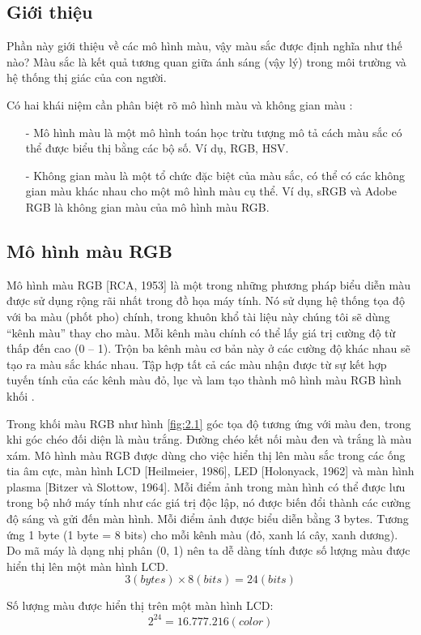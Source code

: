 \subsection{Giới thiệu}
Phần này giới thiệu về các mô hình màu, vậy màu sắc được định nghĩa như thế nào? Màu sắc là kết quả tương quan giữa ánh sáng (vậy lý) trong môi trường và hệ thống thị giác của con người.\par

Có hai khái niệm cần phân biệt rõ mô hình màu và không gian màu \cite{digitalimageprocessing}:
\begin{itemize}
    \item[-] Mô hình màu là một mô hình toán học trừu tượng mô tả cách màu sắc có thể được biểu thị bằng các bộ số. Ví dụ, RGB, HSV.
    \item[-] Không gian màu là một tổ chức đặc biệt của màu sắc, có thể có các không gian màu khác nhau cho một mô hình màu cụ thể. Ví dụ, sRGB và Adobe RGB là không gian màu của mô hình màu RGB.
\end{itemize}

\subsection{Mô hình màu RGB} \label{subsection-rgb-color-model}
Mô hình màu RGB [RCA, 1953] là một trong những phương pháp biểu diễn màu được sử dụng rộng rãi nhất trong đồ họa máy tính. Nó sử dụng hệ thống tọa độ với ba màu (phốt pho) chính, trong khuôn khổ tài liệu này chúng tôi sẽ dùng ``kênh màu'' thay cho màu. Mỗi kênh màu chính có thể lấy giá trị cường độ từ thấp đến cao (0 -- 1). Trộn ba kênh màu cơ bản này ở các cường độ khác nhau sẽ tạo ra màu sắc khác nhau. Tập hợp tất cả các màu nhận được từ sự kết hợp tuyến tính của các kênh màu đỏ, lục và lam tạo thành mô hình màu RGB hình khối .\par

Trong khối màu RGB như hình \ref{fig:2.1} góc tọa độ tương ứng với màu đen, trong khi góc chéo đối diện là màu trắng. Đường chéo kết nối màu đen và trắng là màu xám. Mô hình màu RGB được dùng cho việc hiển thị lên màu sắc trong các ống tia âm cực, màn hình LCD [Heilmeier, 1986], LED [Holonyack, 1962] và màn hình plasma [Bitzer và Slottow, 1964]. Mỗi điểm ảnh trong màn hình có thể được lưu trong bộ nhớ máy tính như các giá trị độc lập, nó được biến đổi thành các cường độ sáng và gửi đến màn hình. Mỗi điểm ảnh được biểu diễn bằng 3 bytes. Tương ứng 1 byte (1 byte = 8 bits) cho mỗi kênh màu (đỏ, xanh lá cây, xanh dương). Do mã máy là dạng nhị phân (0, 1) nên ta dễ dàng tính được số lượng màu được hiển thị lên một màn hình LCD.
$$ 3(bytes) \times 8(bits) = 24(bits) $$ \par
Số lượng màu được hiển thị trên một màn hình LCD:
$$ 2^{24} = 16.777.216 (color) $$\par

